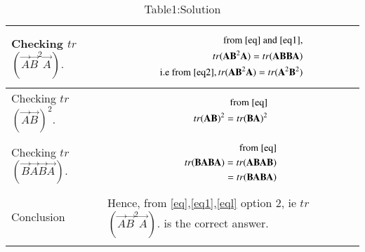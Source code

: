 \documentclass[journal,12pt,onecolumn]{IEEEtran}
\begin{document}
\begin{longtable}{|p{5cm}|p{13cm}|}
\hline
 Checking $tr$$(\vec{A} \vec{B}^2 \vec{A}).$&
\parbox{12cm}{\begin{align}\text{from \eqref{eq} and \eqref{eq1},}\\
 tr(\vec{A} \vec{B}^2 \vec{A}) =tr(\vec{A}\vec{B} \vec{B}\vec{A})\\
\text{ i.e from \eqref{eq2}} ,  tr(\vec{A} \vec{B}^2 \vec{A})=  tr(\vec{A}^2 \vec{B}^2)\label{eq3}\label{eql}  
\end{align}}\\
\hline
Checking $tr$$(\vec{A} \vec{B})^2.$&
\parbox{12cm}{\begin{align}\text{from \eqref{eq}}\\
 tr(\vec{A} \vec{B})^2=tr(\vec{B}\vec{A})^2 
\end{align}}\\
\hline
 Checking $tr$$(\vec{B} \vec{A} \vec{B} \vec{A}).$&
\parbox{12cm}{\begin{align}\text{from \eqref{eq}}\\
 tr(\vec{B} \vec{A} \vec{B} \vec{A}) =tr(\vec{A}\vec{B} \vec{A}\vec{B})\\
 =tr(\vec{B}\vec{A} \vec{B}\vec{A})
 \end{align}}\\
\hline
 Conclusion&
Hence, from \eqref{eq},\eqref{eq1},\eqref{eql} option 2, ie  $tr$$(\vec{A} \vec{B}^2 \vec{A}).$ is the correct answer.\\
\hline
\caption*{Table1:Solution}
\end{longtable}
\end{document}
